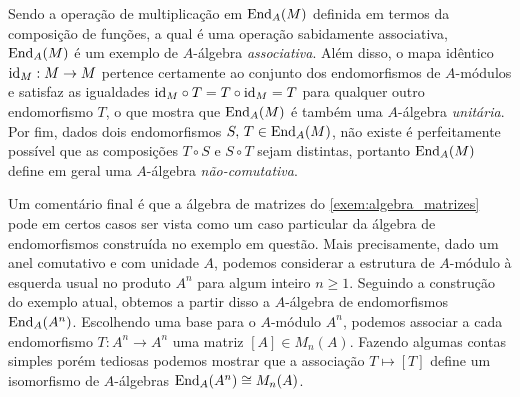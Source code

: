 \begin{exem}
  Sendo a operação de multiplicação em $\mathrm{End}_{A}(M)$ definida em termos da composição de funções, a qual é uma operação sabidamente associativa, $\mathrm{End}_{A}(M)$ é um exemplo de $A$-álgebra \emph{associativa}.
  Além disso, o mapa idêntico $\mathrm{id}_{M}: M \to M$ pertence certamente ao conjunto dos endomorfismos de $A$-módulos e satisfaz as igualdades $\mathrm{id}_{M} \circ T = T \circ \mathrm{id}_{M} = T$ para qualquer outro endomorfismo $T$, o que mostra que $\mathrm{End}_{A}(M)$ é também uma $A$-álgebra \emph{unitária}.
  Por fim, dados dois endomorfismos $S,\, T \in \mathrm{End}_{A}(M)$, não existe é perfeitamente possível que as composições $T \circ S$ e $S \circ T$ sejam distintas, portanto $\mathrm{End}_{A}(M)$ define em geral uma $A$-álgebra \emph{não-comutativa}.

  Um comentário final é que a álgebra de matrizes do \cref{exem:algebra_matrizes} pode em certos casos ser vista como um caso particular da álgebra de endomorfismos construída no exemplo em questão.
  Mais precisamente, dado um anel comutativo e com unidade $A$, podemos considerar a estrutura de $A$-módulo à esquerda usual no produto $A^{n}$ para algum inteiro $n \geq 1$.
  Seguindo a construção do exemplo atual, obtemos a partir disso a $A$-álgebra de endomorfismos $\mathrm{End}_{A}(A^{n})$.
  Escolhendo uma base para o $A$-módulo $A^{n}$, podemos associar a cada endomorfismo $T: A^{n} \to A^{n}$ uma matriz $[A] \in M_{n}(A)$.
  Fazendo algumas contas simples porém tediosas podemos mostrar que a associação $T \mapsto [T]$ define um isomorfismo de $A$-álgebras $\mathrm{End}_{A}(A^{n}) \cong M_{n}(A)$.
\end{exem}

